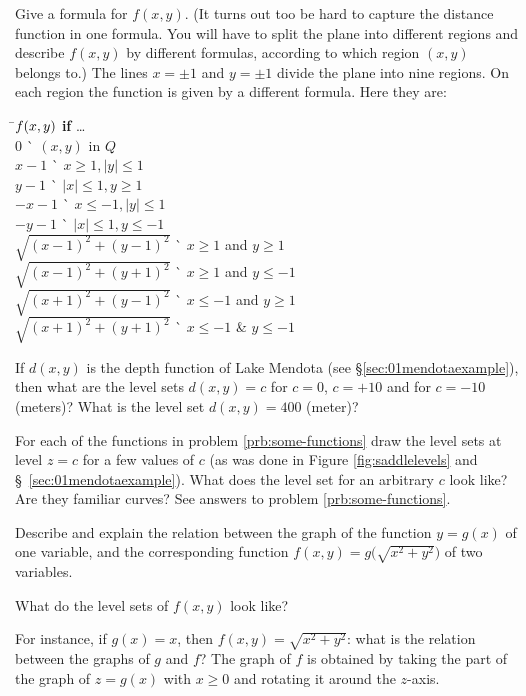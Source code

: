 \subprob Give a formula for $f(x, y)$.  (It turns out too be hard to
capture the distance function in one formula.  You will have to split the
plane into different regions and describe $f(x,y)$ by different formulas,
according to which region $(x,y)$ belongs to.)
\answer%
The lines $x=\pm1$ and $y=\pm1$ divide the plane into nine regions.
On each region the function is given by a different formula.
Here they are:
\begin{tabbing}
\=$\boldmath{f(x, y)}$ \=\`\textbf{ if } \ldots \\
\>$0$  \>\` $(x, y)$ in $Q$\\
\>$x-1$ \>\` $x\geq1, |y|\leq 1$\\
\>$y-1$ \>\` $|x|\leq 1, y\geq1$\\
\>$-x-1$ \>\` $x\le-1, |y|\leq 1$\\
\>$-y-1$ \>\` $|x|\leq 1, y\le-1$\\
\>$\sqrt{(x-1)^2+(y-1)^2}$ \>\` $x\ge1$ and $y\ge1$\\
\>$\sqrt{(x-1)^2+(y+1)^2}$ \>\` $x\ge1$ and $y\le-1$\\
\>$\sqrt{(x+1)^2+(y-1)^2}$ \>\` $x\le-1$ and $y\ge1$\\
\>$\sqrt{(x+1)^2+(y+1)^2}$ \>\` $x\le-1$ \& $y\le-1$\\
\end{tabbing}
\endanswer


\problem If $d(x, y)$ is the depth function of Lake Mendota (see%
\S\ref{sec:01mendotaexample}), then what are the level sets $d(x, y) =
c$ for $c=0$, $c=+10$ and for $c=-10$ (meters)?  What is the level
set $d(x, y) = 400$ (meter)?

\problem For each of the functions in problem \ref{prb:some-functions}%
draw the level sets at level $z=c$ for a few values of $c$ (as was
done in Figure \ref{fig:saddlelevels} and
\S~\ref{sec:01mendotaexample}).  What does the level set for an
arbitrary $c$ look like?  Are they familiar curves?
\answer%
See answers to problem \ref{prb:some-functions}.
\endanswer

\problem Describe and explain the relation between the graph of the%
function $y=g(x)$ of one variable, and the corresponding function
$f(x, y) = g\bigl( \sqrt{x^2+y^2} \bigr)$ of two variables.

What do the level sets of $f(x, y)$ look like?

For instance, if $g(x) = x$, then $f(x, y) = \sqrt{x^2+y^2}$: what is
the relation between the graphs of $g$ and $f$?
\answer%
The graph of $f$ is obtained by taking the part of the graph of $z=g(x)$
with $x\ge0$ and rotating it around the $z$-axis.

